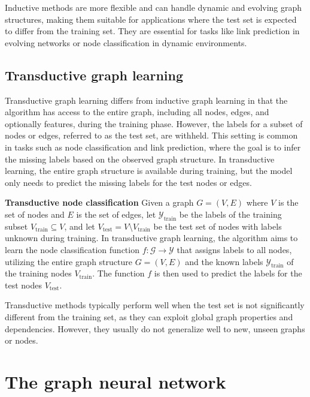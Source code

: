 Inductive methods are more flexible and can handle dynamic and evolving graph structures, making them suitable for applications where the test set is expected to differ from the training set. They are essential for tasks like link prediction in evolving networks or node classification in dynamic environments.

\subsection{Transductive graph learning}

Transductive graph learning differs from inductive graph learning in that the algorithm has access to the entire graph, including all nodes, edges, and optionally features, during the training phase. However, the labels for a subset of nodes or edges, referred to as the test set, are withheld. This setting is common in tasks such as node classification and link prediction, where the goal is to infer the missing labels based on the observed graph structure. In transductive learning, the entire graph structure is available during training, but the model only needs to predict the missing labels for the test nodes or edges.

\begin{example}\textbf{Transductive node classification}
	Given a graph \( G = \left( V, E \right) \) where \( V \) is the set of nodes and \( E \) is the set of edges, let \( \mathcal{Y}_\mathrm{train} \) be the labels of the training subset \( V_\mathrm{train} \subseteq V \), and let \( V_\mathrm{test} = V \setminus V_\mathrm{train} \) be the test set of nodes with labels unknown during training. In transductive graph learning, the algorithm aims to learn the node classification function \( f: \mathcal{G} \rightarrow \mathcal{Y} \) that assigns labels to all nodes, utilizing the entire graph structure \( G = \left( V, E \right) \) and the known labels \( \mathcal{Y}_\mathrm{train} \) of the training nodes \( V_\mathrm{train} \). The function \( f \) is then used to predict the labels for the test nodes \( V_\mathrm{test} \).
\end{example}

Transductive methods typically perform well when the test set is not significantly different from the training set, as they can exploit global graph properties and dependencies. However, they usually do not generalize well to new, unseen graphs or nodes.

\section{The graph neural network}\label{sec:gori}

